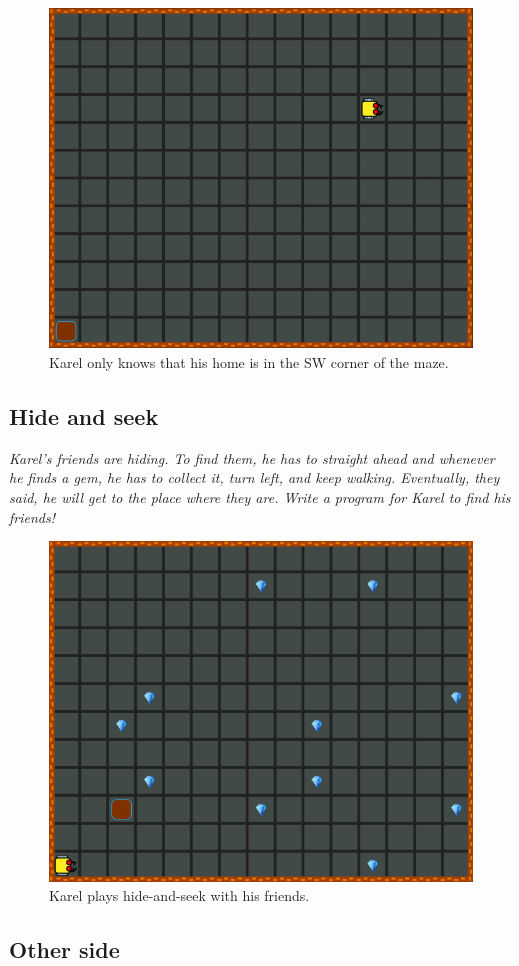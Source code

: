 {{\begin{figure}[!ht]
\begin{center}
\includegraphics[height=0.4\textwidth]{img/e01.png}
\end{center}
\vspace{-4mm}
\caption{Karel only knows that his home is in the SW corner of the maze.}
\label{fig:e01}
\end{figure}



\subsection{Hide and seek}

{\em Karel's friends are hiding. To find them, he has to straight ahead 
and whenever he finds a gem, he has to collect it, 
turn left, and keep walking. Eventually, they said, he will get to the place 
where they are. Write a program for Karel to find his friends!}


\begin{figure}[!ht]
\begin{center}
\includegraphics[height=0.4\textwidth]{img/e02.png}
\end{center}
\vspace{-4mm}
\caption{Karel plays hide-and-seek with his friends.}
\label{fig:e02}
\end{figure}



\subsection{Other side}

}}
